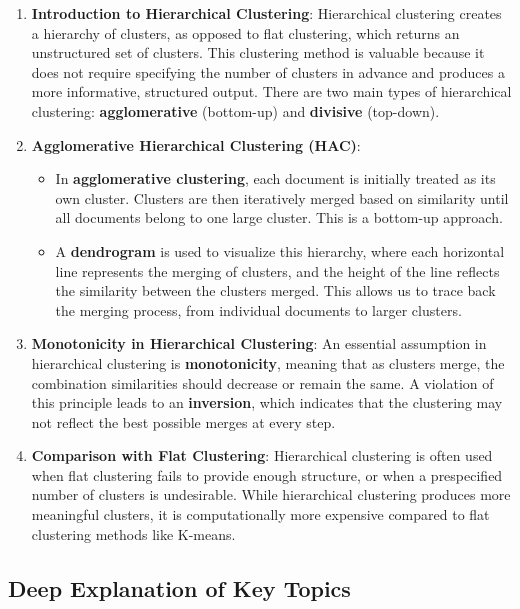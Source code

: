 \documentclass{article}
\begin{document}
\begin{enumerate}
    \item \textbf{Introduction to Hierarchical Clustering}:  
    Hierarchical clustering creates a hierarchy of clusters, as opposed to flat clustering, which returns an unstructured set of clusters. This clustering method is valuable because it does not require specifying the number of clusters in advance and produces a more informative, structured output. There are two main types of hierarchical clustering: \textbf{agglomerative} (bottom-up) and \textbf{divisive} (top-down).

    \item \textbf{Agglomerative Hierarchical Clustering (HAC)}:
    \begin{itemize}
        \item In \textbf{agglomerative clustering}, each document is initially treated as its own cluster. Clusters are then iteratively merged based on similarity until all documents belong to one large cluster. This is a bottom-up approach.
        \item A \textbf{dendrogram} is used to visualize this hierarchy, where each horizontal line represents the merging of clusters, and the height of the line reflects the similarity between the clusters merged. This allows us to trace back the merging process, from individual documents to larger clusters.
    \end{itemize}

    \item \textbf{Monotonicity in Hierarchical Clustering}:  
    An essential assumption in hierarchical clustering is \textbf{monotonicity}, meaning that as clusters merge, the combination similarities should decrease or remain the same. A violation of this principle leads to an \textbf{inversion}, which indicates that the clustering may not reflect the best possible merges at every step.

    \item \textbf{Comparison with Flat Clustering}:  
    Hierarchical clustering is often used when flat clustering fails to provide enough structure, or when a prespecified number of clusters is undesirable. While hierarchical clustering produces more meaningful clusters, it is computationally more expensive compared to flat clustering methods like K-means.
\end{enumerate}

\hrulefill

\subsection{Deep Explanation of Key Topics}
\end{document}
